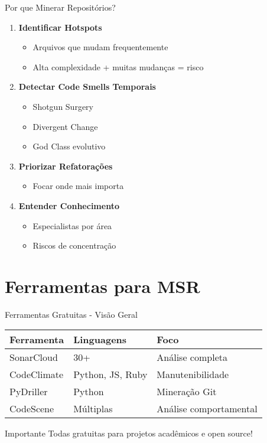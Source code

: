 \documentclass[aspectratio=169,11pt]{beamer}
\begin{document}
\begin{frame}{Por que Minerar Repositórios?}
\begin{enumerate}
    \item \textbf{Identificar Hotspots}
    \begin{itemize}
        \item Arquivos que mudam frequentemente
        \item Alta complexidade + muitas mudanças = risco
    \end{itemize}
    
    \item \textbf{Detectar Code Smells Temporais}
    \begin{itemize}
        \item Shotgun Surgery
        \item Divergent Change
        \item God Class evolutivo
    \end{itemize}
    
    \item \textbf{Priorizar Refatorações}
    \begin{itemize}
        \item Focar onde mais importa
    \end{itemize}
    
    \item \textbf{Entender Conhecimento}
    \begin{itemize}
        \item Especialistas por área
        \item Riscos de concentração
    \end{itemize}
\end{enumerate}
\end{frame}

\section{Ferramentas para MSR}

\begin{frame}{Ferramentas Gratuitas - Visão Geral}
\begin{table}[]
\centering
\small
\begin{tabular}{|l|l|l|}
\hline
\textbf{Ferramenta} & \textbf{Linguagens} & \textbf{Foco} \\ \hline
SonarCloud & 30+ & Análise completa \\ \hline
CodeClimate & Python, JS, Ruby & Manutenibilidade \\ \hline
PyDriller & Python & Mineração Git \\ \hline
CodeScene & Múltiplas & Análise comportamental \\ \hline
\end{tabular}
\end{table}

\begin{alertblock}{ Importante}
Todas gratuitas para projetos acadêmicos e open source!
\end{alertblock}
\end{frame}
\end{document}
